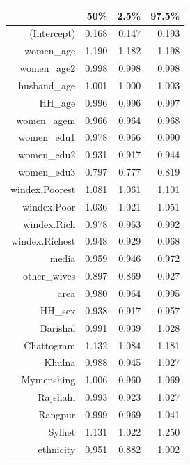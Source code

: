 \begin{table}[ht]
\centering
\begin{tabular}{rrrr}
  \hline
 & 50\% & 2.5\% & 97.5\% \\ 
  \hline
(Intercept) & 0.168 & 0.147 & 0.193 \\ 
  women\_age & 1.190 & 1.182 & 1.198 \\ 
  women\_age2 & 0.998 & 0.998 & 0.998 \\ 
  husband\_age & 1.001 & 1.000 & 1.003 \\ 
  HH\_age & 0.996 & 0.996 & 0.997 \\ 
  women\_agem & 0.966 & 0.964 & 0.968 \\ 
  women\_edu1 & 0.978 & 0.966 & 0.990 \\ 
  women\_edu2 & 0.931 & 0.917 & 0.944 \\ 
  women\_edu3 & 0.797 & 0.777 & 0.819 \\ 
  windex.Poorest & 1.081 & 1.061 & 1.101 \\ 
  windex.Poor & 1.036 & 1.021 & 1.051 \\ 
  windex.Rich & 0.978 & 0.963 & 0.992 \\ 
  windex.Richest & 0.948 & 0.929 & 0.968 \\ 
  media & 0.959 & 0.946 & 0.972 \\ 
  other\_wives & 0.897 & 0.869 & 0.927 \\ 
  area & 0.980 & 0.964 & 0.995 \\ 
  HH\_sex & 0.938 & 0.917 & 0.957 \\ 
  Barishal & 0.991 & 0.939 & 1.028 \\ 
  Chattogram & 1.132 & 1.084 & 1.181 \\ 
  Khulna & 0.988 & 0.945 & 1.027 \\ 
  Mymenshing & 1.006 & 0.960 & 1.069 \\ 
  Rajshahi & 0.993 & 0.923 & 1.027 \\ 
  Rangpur & 0.999 & 0.969 & 1.041 \\ 
  Sylhet & 1.131 & 1.022 & 1.250 \\ 
  ethnicity & 0.951 & 0.882 & 1.002 \\ 
   \hline
\end{tabular}
\end{table}
